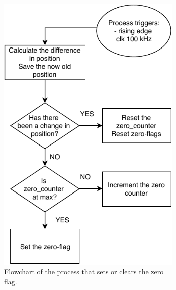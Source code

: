 \documentclass[../../main.tex]{subfiles}
\begin{document}
\begin{figure}[h]
\begin{subfigure}{0.48\textwidth}
    \includegraphics[width = 0.97\textwidth]{Sections/System_Implementation/Images/FPGAProcessSpeedZeroFlowchart.pdf}
    \caption{Flowchart of the process that sets or clears the zero flag.}
    \label{subfig:FPGAProcessSpeedZeroFlowchart}
\end{subfigure}\quad
\begin{subfigure}{0.48\textwidth}

\end{subfigure}
\end{figure}
\end{document}
